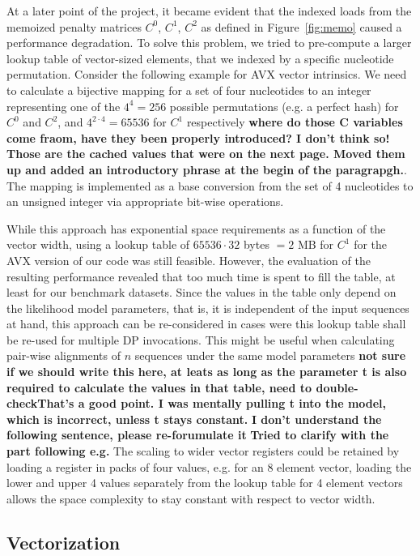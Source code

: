 \documentclass[runningheads,a4paper]{llncs}
\begin{document}
At a later point of the project, it became evident that the indexed loads from the memoized penalty matrices $C^0$, $C^1$, $C^2$ as defined in Figure~\ref{fig:memo} caused a performance degradation. 
To solve this problem, we tried to pre-compute a larger lookup table of vector-sized elements, that we indexed by a specific nucleotide permutation. 
Consider the following example for AVX vector intrinsics.
We need to calculate a bijective mapping for a set of four nucleotides to an integer representing one of the $4^4 = 256$ possible permutations (e.g. a perfect hash) 
for $C^0$ and $C^2$, and $4^{2 \cdot 4} = 65536$ for $C^1$ respectively {\bf where do those C variables come fraom, have they been properly introduced? I don't think so!} {\bf Those are the cached values that were on the next page. Moved them up and added an introductory phrase at the begin of the paragrapgh.}. 
The mapping is implemented as a base conversion from the set of 4 nucleotides to an unsigned integer via appropriate bit-wise operations.

While this approach has exponential space requirements as a function of the vector width, using a lookup table of $65536 \cdot 32$ bytes $= 2$ MB for $C^1$ for 
the AVX version of our code was still feasible. 
However, the evaluation of the resulting performance revealed that too much time is spent to fill the table, at least for our benchmark datasets. 
Since the values in the table only depend on the likelihood model parameters, that is, it is independent of the input sequences at hand, 
this approach can be re-considered in cases were this lookup table shall be re-used for multiple DP invocations. 
This might be useful when calculating pair-wise alignments of $n$ sequences under the same model parameters 
{\bf not sure if we should write this here, at leats as long as the parameter t is also required to calculate the values in that table, need to double-check}{\bf That's a good point. I was mentally pulling t into the model, which is incorrect, unless t stays constant. }
{\bf I don't understand the following sentence, please re-forumulate it} {\bf Tried to clarify with the part following e.g. } The scaling to wider vector registers could be retained by loading a register in packs of four values, e.g. for an 8 element vector, loading the lower and upper 4 values separately from the lookup table for 4 element vectors allows the space complexity to stay constant with respect to vector width.


\subsection{Vectorization}
\label{ssec:vectorization}
\end{document}
